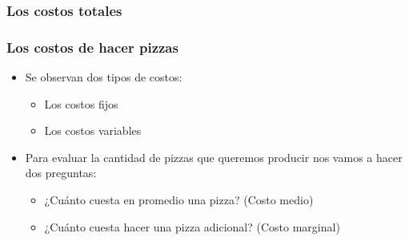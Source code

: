 \documentclass{beamer}
\begin{document}
\begin{frame}
\frametitle{Los costos totales}
\begin{center}
\end{center}
\end{frame}

\begin{frame}
\frametitle{Los costos de hacer pizzas}
\begin{itemize}
    \item Se observan dos tipos de costos: 
        \begin{itemize}
        \item Los costos fijos
        \item Los costos variables
        \end{itemize}
    \vspace{2mm}
    \item Para evaluar la cantidad de pizzas que queremos producir nos vamos a hacer dos preguntas:
        \begin{itemize}
        \item ¿Cuánto cuesta en promedio una pizza? (Costo medio)
        \item ¿Cuánto cuesta hacer una pizza adicional? (Costo marginal)
        \end{itemize}
\end{itemize}
\end{frame}
\end{document}
